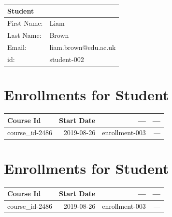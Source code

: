 \documentclass{article}
\begin{document}
\begin{tabular}{lp{5cm}}
  \textbf{Student} & \\
  \hline
  First Name: & Liam \\
  Last Name: & Brown \\
  Email: & liam.brown@edu.ac.uk \\
  id: & student-002 \\
\end{tabular}

\section*{Enrollments for Student}
\begin{longtable}{lrrr}
  \toprule
  Course Id & Start Date & --- & --- \\
  \midrule
  course\_id-2486 & 2019-08-26 & enrollment-003 & --- \\
  \bottomrule
\end{longtable}

\section*{Enrollments for Student}
\begin{longtable}{lrrr}
  \toprule
  Course Id & Start Date & --- & --- \\
  \midrule
  course\_id-2486 & 2019-08-26 & enrollment-003 & --- \\
  \bottomrule
\end{longtable}
\end{document}
